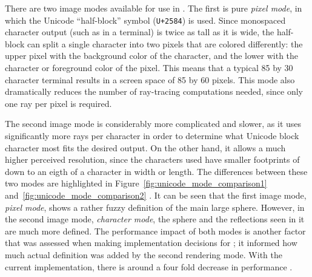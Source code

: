 There are two image modes available for use in \name.
The first is pure {\it pixel mode}, in which the Unicode ``half-block'' symbol (\texttt{U+2584}) is used.
Since monospaced character output (such as in a terminal) is twice as tall as it is wide, the half-block can split a single character into two pixels that are colored differently: the upper pixel with the background color of the character, and the lower with the character or foreground color of the pixel.
This means that a typical 85 by 30 character terminal results in a screen space of 85 by 60 pixels.
This mode also dramatically reduces the number of ray-tracing computations needed, since only one ray per pixel is required.

The second image mode is considerably more complicated and slower, as it uses significantly more rays per character in order to determine what Unicode block character most fits the desired output.
On the other hand, it allows a much higher perceived resolution, since the characters used have smaller footprints of down to an eigth of a character in width or length.
The differences between these two modes are highlighted in Figure~\ref{fig:unicode_mode_comparison1} and~\ref{fig:unicode_mode_comparison2} .
It can be seen that the first image mode, {\it pixel mode}, shows a rather fuzzy definition of the main large sphere.
However, in the second image mode, {\it character mode}, the sphere and the reflections seen in it are much more defined.
The performance impact of both modes is another factor that was assessed when making implementation decisions for \name; it informed how much actual definition was added by the second rendering mode.
With the current implementation, there is around a four fold decrease in performance .

